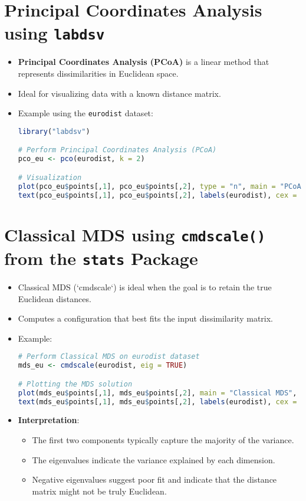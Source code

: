 \section{Principal Coordinates Analysis using \texttt{labdsv}}
\begin{itemize}
    \item \textbf{Principal Coordinates Analysis (PCoA)} is a linear method that represents dissimilarities in Euclidean space.
    \item Ideal for visualizing data with a known distance matrix.
    \item Example using the \texttt{eurodist} dataset:
\begin{lstlisting}[language=R, breaklines=true]
library("labdsv")

# Perform Principal Coordinates Analysis (PCoA)
pco_eu <- pco(eurodist, k = 2)

# Visualization
plot(pco_eu$points[,1], pco_eu$points[,2], type = "n", main = "PCoA of European Cities")
text(pco_eu$points[,1], pco_eu$points[,2], labels(eurodist), cex = 0.8)
\end{lstlisting}
\end{itemize}

\section{Classical MDS using \texttt{cmdscale()} from the \texttt{stats} Package}
\begin{itemize}
    \item Classical MDS (`cmdscale`) is ideal when the goal is to retain the true Euclidean distances.
    \item Computes a configuration that best fits the input dissimilarity matrix.
    \item Example:
\begin{lstlisting}[language=R, breaklines=true]
# Perform Classical MDS on eurodist dataset
mds_eu <- cmdscale(eurodist, eig = TRUE)

# Plotting the MDS solution
plot(mds_eu$points[,1], mds_eu$points[,2], main = "Classical MDS", type = "n")
text(mds_eu$points[,1], mds_eu$points[,2], labels(eurodist), cex = 0.8)
\end{lstlisting}

\item \textbf{Interpretation}:
    \begin{itemize}
        \item The first two components typically capture the majority of the variance.
        \item The eigenvalues indicate the variance explained by each dimension.
        \item Negative eigenvalues suggest poor fit and indicate that the distance matrix might not be truly Euclidean.
    \end{itemize}
\end{itemize}

